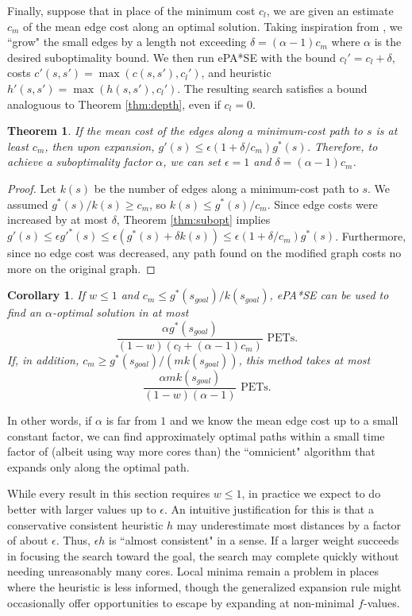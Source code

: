 \documentclass[letterpaper]{article}
\newtheorem{thm}{Theorem}
\newtheorem{cor}{Corollary}
\begin{document}
Finally, suppose that in place of the minimum cost $c_l$, we are given an estimate $c_m$ of the mean edge cost along an optimal solution. Taking inspiration from \cite{klein1997randomized}, we ``grow" the small edges by a length not exceeding $\delta = (\alpha-1)c_m$ where $\alpha$ is the desired suboptimality bound. We then run ePA*SE with the bound $c_l' = c_l+\delta$, costs $c'(s,s') = \max(c(s,s'), c_l')$, and heuristic $h'(s,s') = \max(h(s,s'), c_l')$. The resulting search satisfies a bound analoguous to Theorem \ref{thm:depth}, even if $c_l=0$.

\begin{thm}
\label{thm:delta}
If the mean cost of the edges along a minimum-cost path to $s$ is at least $c_m$, then upon expansion, $g'(s) \le \epsilon(1+\delta/c_m)g^*(s)$. Therefore, to achieve a suboptimality factor $\alpha$, we can set $\epsilon=1$ and $\delta = (\alpha-1)c_m$.
\end{thm}

\begin{proof}
Let $k(s)$ be the number of edges along a minimum-cost path to $s$. We assumed $g^*(s) / k(s) \ge c_m$, so $k(s) \le g^*(s) / c_m$.
Since edge costs were increased by at most $\delta$, Theorem \ref{thm:subopt} implies $g'(s) \le \epsilon g'^*(s) \le \epsilon(g^*(s) + \delta k(s)) \le \epsilon(1+\delta/c_m)g^*(s)$. Furthermore, since no edge cost was decreased, any path found on the modified graph costs no more on the original graph.
\end{proof}

\begin{cor}
\label{cor:delta}
If $w \le 1$ and $c_m \le g^*(s_{goal}) / k(s_{goal})$, ePA*SE can be used to find an $\alpha$-optimal solution in at most
\[\frac{\alpha g^*(s_{goal})}{(1-w)(c_l+(\alpha-1)c_m)}\text{ PETs.}\]
If, in addition, $c_m \ge g^*(s_{goal})/(mk(s_{goal}))$, this method takes at most
\[\frac{\alpha mk(s_{goal})}{(1-w)(\alpha-1)}\text{ PETs.}\]
\end{cor}

In other words, if $\alpha$ is far from $1$ and we know the mean edge cost up to a small constant factor, we can find approximately optimal paths within a small time factor of (albeit using way more cores than) the ``omnicient" algorithm that expands only along the optimal path.

While every result in this section requires $w\le 1$, in practice we expect to do better with larger values up to $\epsilon$. An intuitive justification for this is that a conservative consistent heuristic $h$ may underestimate most distances by a factor of about $\epsilon$. Thus, $\epsilon h$ is ``almost consistent" in a sense. If a larger weight succeeds in focusing the search toward the goal, the search may complete quickly without needing unreasonably many cores. Local minima remain a problem in places where the heuristic is less informed, though the generalized expansion rule might occasionally offer opportunities to escape by expanding at non-minimal $f$-values.
\end{document}
